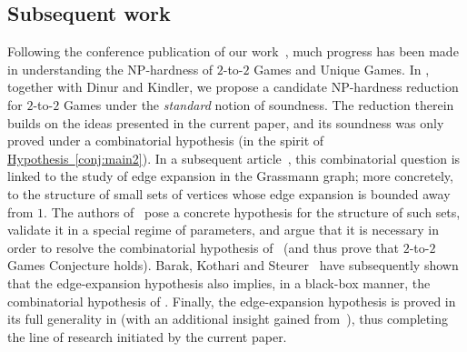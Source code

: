 \documentclass[11pt]{article}
\numberwithin{equation}{section}
\theoremstyle{definition}
\theoremstyle{plain}
\newcommand{\expref}[2]{\hyperref[#2]{#1~\ref{#2}}}
\begin{document}
%
\subsection{Subsequent work}\label{sec:subsequent}  %
Following %
the conference publication of our work~\cite{conf-version}, %
much progress has been %
made %
in understanding the NP-hardness of $2$-to-$2$ Games and Unique Games.
In \cite{DKKMS1}, together with Dinur and Kindler, we propose a candidate NP-hardness reduction for $2$-to-$2$ Games under the
\emph{standard} notion of soundness. The reduction therein builds on the ideas presented in the current paper,
and its soundness was only proved under a combinatorial hypothesis (in the spirit of \expref{Hypothesis}{conj:main2}).
%
In a subsequent article~\cite{DKKMS2},  %
this combinatorial question is linked to the study of
%
edge expansion  %
in the Grassmann graph;
more concretely, to the structure of small sets of vertices whose edge expansion is
bounded away from $1$.
The authors of~\cite{DKKMS2} pose a concrete hypothesis for the structure of such sets,
validate it in a special regime of parameters,
and argue that it is necessary in order to resolve the combinatorial hypothesis
of~\cite{DKKMS2} (and thus prove that $2$-to-$2$ Games Conjecture holds).
Barak, Kothari and Steurer~\cite{BKS} have %
subsequently  %
%
shown  %
that the edge-expansion hypothesis also implies, in a black-box manner,
the combinatorial hypothesis of \cite{DKKMS2}. Finally, the edge-expansion hypothesis
is proved in its full generality in \cite{KMS2}
(with an additional insight gained from~\cite{KMMS}), thus completing the line of
research initiated by the current paper.
\end{document}
